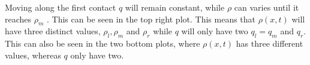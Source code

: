 \documentclass[10pt]{article}
\numberwithin{equation}{section}
\begin{document}
Moving along the first contact $q$ will remain constant, while $\rho$ can varies until it reaches $\rho_m$ . This can be seen in the top right plot. This means that $\rho(x,t)$ will have three distinct values, $\rho_l, \rho_m $ and $\rho_r$ while $q$ will only have two $q_l = q_m$ and $q_r$. This can also be seen in the two bottom plots, where $\rho(x,t)$ has three different values, whereas $q $ only have two. 

\end{document}
